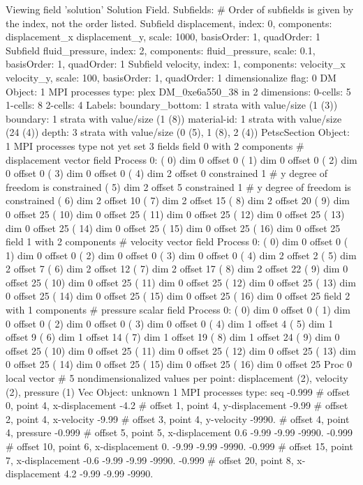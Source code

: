 \begin{shell}
Viewing field 'solution' Solution Field.
  Subfields: # Order of subfields is given by the index, not the order listed.
    Subfield displacement, index: 0, components: displacement_x displacement_y, scale: 1000, basisOrder: 1, quadOrder: 1
    Subfield fluid_pressure, index: 2, components: fluid_pressure, scale: 0.1, basisOrder: 1, quadOrder: 1
    Subfield velocity, index: 1, components: velocity_x velocity_y, scale: 100, basisOrder: 1, quadOrder: 1
  dimensionalize flag: 0
DM Object: 1 MPI processes
  type: plex
DM_0xe6a550_38 in 2 dimensions:
  0-cells: 5
  1-cells: 8
  2-cells: 4
Labels:
  boundary_bottom: 1 strata with value/size (1 (3))
  boundary: 1 strata with value/size (1 (8))
  material-id: 1 strata with value/size (24 (4))
  depth: 3 strata with value/size (0 (5), 1 (8), 2 (4))
PetscSection Object: 1 MPI processes
  type not yet set
3 fields
  field 0 with 2 components # displacement vector field
Process 0:
  (   0) dim  0 offset   0
  (   1) dim  0 offset   0
  (   2) dim  0 offset   0
  (   3) dim  0 offset   0
  (   4) dim  2 offset   0 constrained 1 # y degree of freedom is constrained
  (   5) dim  2 offset   5 constrained 1 # y degree of freedom is constrained
  (   6) dim  2 offset  10
  (   7) dim  2 offset  15
  (   8) dim  2 offset  20
  (   9) dim  0 offset  25
  (  10) dim  0 offset  25
  (  11) dim  0 offset  25
  (  12) dim  0 offset  25
  (  13) dim  0 offset  25
  (  14) dim  0 offset  25
  (  15) dim  0 offset  25
  (  16) dim  0 offset  25
  field 1 with 2 components # velocity vector field
Process 0:
  (   0) dim  0 offset   0
  (   1) dim  0 offset   0
  (   2) dim  0 offset   0
  (   3) dim  0 offset   0
  (   4) dim  2 offset   2
  (   5) dim  2 offset   7
  (   6) dim  2 offset  12
  (   7) dim  2 offset  17
  (   8) dim  2 offset  22
  (   9) dim  0 offset  25
  (  10) dim  0 offset  25
  (  11) dim  0 offset  25
  (  12) dim  0 offset  25
  (  13) dim  0 offset  25
  (  14) dim  0 offset  25
  (  15) dim  0 offset  25
  (  16) dim  0 offset  25
  field 2 with 1 components # pressure scalar field
Process 0:
  (   0) dim  0 offset   0
  (   1) dim  0 offset   0
  (   2) dim  0 offset   0
  (   3) dim  0 offset   0
  (   4) dim  1 offset   4
  (   5) dim  1 offset   9
  (   6) dim  1 offset  14
  (   7) dim  1 offset  19
  (   8) dim  1 offset  24
  (   9) dim  0 offset  25
  (  10) dim  0 offset  25
  (  11) dim  0 offset  25
  (  12) dim  0 offset  25
  (  13) dim  0 offset  25
  (  14) dim  0 offset  25
  (  15) dim  0 offset  25
  (  16) dim  0 offset  25
Proc 0 local vector # 5 nondimensionalized values per point: displacement (2), velocity (2), pressure (1)
Vec Object: unknown 1 MPI processes
  type: seq
-0.999 # offset  0, point 4, x-displacement
-4.2 # offset 1, point 4, y-displacement
-9.99 # offset 2, point 4, x-velocity
-9.99 # offset 3, point 4, y-velocity
-9990. # offset 4, point 4, pressure
-0.999 # offset 5, point 5, x-displacement
0.6
-9.99
-9.99
-9990.
-0.999 # offset 10, point 6, x-displacement
0.
-9.99
-9.99
-9990.
-0.999 # offset 15, point 7, x-displacement
-0.6
-9.99
-9.99
-9990.
-0.999 # offset 20, point 8, x-displacement
4.2
-9.99
-9.99
-9990.
\end{shell}

